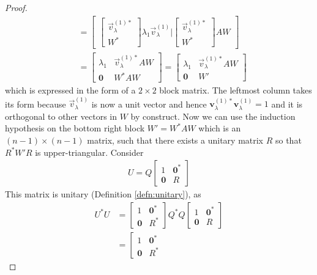 \begin{proof}
\begin{align*}
&= 
\begin{bmatrix}
\left[\begin{array}{c}
\vec{v}_\lambda^{(1)*} \\
\hline
W^*
\end{array}\right]\lambda_1\vec{v}_\lambda^{(1)} | 
\left[\begin{array}{c}
\vec{v}_\lambda^{(1)*} \\
\hline
W^*
\end{array}\right]AW
\end{bmatrix} \\
&=
\left[\begin{array}{cc}
\lambda_1 & \vec{v}_\lambda^{(1)*}AW \\
\textbf{0} & W^*AW
\end{array}\right]
=
\left[\begin{array}{cc}
\lambda_1 & \vec{v}_\lambda^{(1)*}AW \\
\textbf{0} & W'
\end{array}\right]
\end{align*}
which is expressed in the form of a $2\times 2$ block matrix. The leftmost column takes its form because $\vec{v}_\lambda^{(1)}$ is now a unit vector and hence $\textbf{v}_\lambda^{(1)*} \textbf{v}_\lambda^{(1)} = 1$ and it is orthogonal to other vectors in $W$ by construct. Now we can use the induction hypothesis on the bottom right block $W' = W^*AW$ which is an $(n-1) \times (n-1)$ matrix, such that there exists a unitary matrix $R$ so that $R^*W'R$ is upper-triangular. Consider
\begin{align*}
U = 
Q 
\left[\begin{array}{cc}
1 & \textbf{0}^* \\
\textbf{0} & R
\end{array}\right]
\end{align*}
This matrix is unitary (Definition \ref{defn:unitary}), as
\begin{align*}
U^*U &=  
\left[\begin{array}{cc}
1 & \textbf{0}^* \\
\textbf{0} & R^*
\end{array}\right]
Q^* Q 
\left[\begin{array}{cc}
1 & \textbf{0}^* \\
\textbf{0} & R
\end{array}\right] \\
&= \left[\begin{array}{cc}
1 & \textbf{0}^* \\
\textbf{0} & R^*

\end{array}
\end{align*}
\end{proof}
